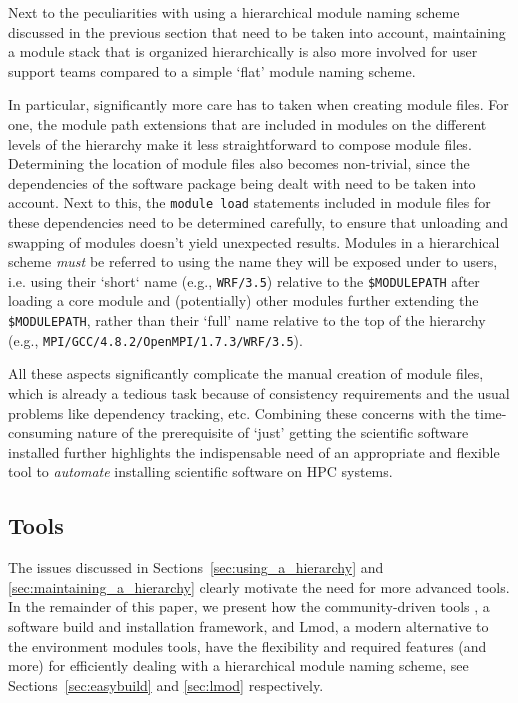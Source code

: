 Next to the peculiarities with using a hierarchical module naming scheme discussed in
the previous section that need to be taken into account, maintaining a module stack
that is organized hierarchically is also more involved for user support teams
compared to a simple `flat' module naming scheme.

In particular, significantly more care has to taken when creating
module files. For one, the module path extensions that are included in modules
on the different levels of the hierarchy make it less straightforward to compose
module files. Determining the location of module files also becomes
non-trivial, since the dependencies of the software package being dealt with need
to be taken into account. Next to this, the \texttt{\small module load} statements
included in module files for these dependencies need to be determined carefully, to
ensure that unloading and swapping of modules doesn't yield unexpected results.
Modules in a hierarchical scheme \emph{must} be referred to using the name they will 
be exposed under to users, i.e. using their `short` name (e.g.,
\texttt{\small WRF/3.5}) relative to the \texttt{\small \$MODULEPATH} after loading
a core module and (potentially) other modules further extending the \texttt{\small
\$MODULEPATH}, rather than their `full' name relative to the top of the hierarchy
(e.g., \texttt{\small MPI/GCC/4.8.2/OpenMPI/1.7.3/WRF/3.5}).

All these aspects significantly complicate the manual creation of module files, which
is already a tedious task because of consistency requirements and the usual problems
like dependency tracking, etc. Combining these concerns with the time-consuming
nature of the prerequisite of `just' getting the scientific software installed
further highlights the indispensable need of an appropriate and flexible tool to
\emph{automate} installing scientific software on HPC systems.

\subsection{Tools}
\label{sec:tools_for_hierarchical}

The issues discussed in Sections~\ref{sec:using_a_hierarchy} and
\ref{sec:maintaining_a_hierarchy} clearly motivate the need for more advanced tools.
In the remainder of this paper, we present how the community-driven tools
\easybuild{}, a software build and installation framework, and Lmod, a modern
alternative to the environment modules tools, have the flexibility and required
features (and more) for efficiently dealing with a hierarchical module naming scheme,
see Sections~\ref{sec:easybuild} and \ref{sec:lmod} respectively.
